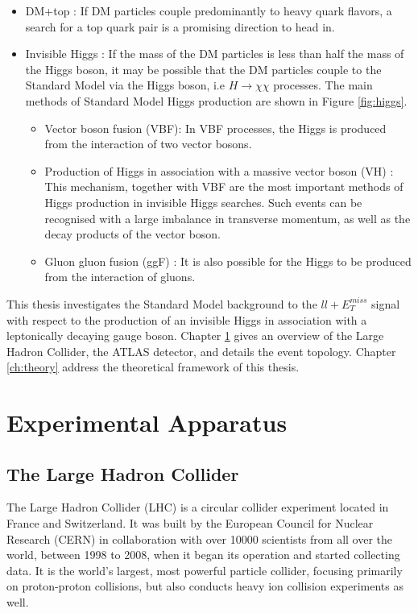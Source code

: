 \documentclass[11pt,a4paper,openright,twoside]{report}
\newcommand{\met}{$E_T^{miss}$ }
\begin{document}
\begin{itemize}
\item DM+top : If DM particles couple predominantly to heavy quark flavors, a search for a top quark pair is a promising direction to head in.
\item Invisible Higgs :  If the mass of the DM particles is less than half the mass of the Higgs boson, it may be possible that the DM particles couple to the Standard Model via the Higgs boson, i.e $H\to\chi\chi$ processes. The main methods of Standard Model Higgs production are shown in Figure \ref{fig:higgs}.
	\begin{itemize}
	\item Vector boson fusion (VBF): In VBF processes, the Higgs is produced from the interaction of two vector bosons.
	\item Production of Higgs in association with a massive vector boson (VH) : This mechanism, together with VBF are the most important methods of Higgs production in invisible Higgs searches. Such events can be recognised with a large imbalance in transverse momentum, as well as the decay products of the vector boson.
	\item Gluon gluon fusion (ggF) : It is also possible for the Higgs to be produced from the interaction of gluons.
	\end{itemize}
\end{itemize}

This thesis investigates the Standard Model background to the $ll+$\met signal with respect to the production of an invisible Higgs in association with a leptonically decaying gauge boson. Chapter \ref{ch:LHC} gives an overview of the Large Hadron Collider, the ATLAS detector, and details the event topology. Chapter \ref{ch:theory} address the theoretical framework of this thesis.

\chapter{Experimental Apparatus}\label{ch:LHC}

\section{The Large Hadron Collider}
The Large Hadron Collider (LHC) is a circular collider experiment located in France and Switzerland. It was built by the European Council for Nuclear Research (CERN) in collaboration with over 10000 scientists from all over the world, between 1998 to 2008, when it began its operation and started collecting data. It is the world's largest, most powerful particle collider, focusing primarily on proton-proton collisions, but also conducts heavy ion collision experiments as well.
\end{document}
